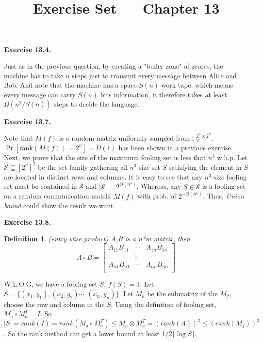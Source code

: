 \documentclass[a4paper]{article}
\title{Exercise Set --- Chapter 13}
\date{}
\newtheorem{definition}{Definition}
\newenvironment{exercise}[1]{
	\par
	\noindent\textbf{Exercise #1.}\quad
}{
	\par
	\bigskip
}
\begin{document}
    \maketitle

    \begin{exercise}{13.4}
    Just as in the previous question, by creating a "buffer zone" of zeores, the machine has to take $n$ steps just to transmit every message between Alice and Bob. And note that the machine has a space $S(n)$ work tape, which means every message can carry $S(n)$ bits information, it therefore takes at least $\Omega(n^2 / S(n))$ steps to decide the language.   
    \end{exercise}

    \begin{exercise}{13.7}
    	Note that $M(f)$ is a random matrix uniformly sampled from $\mathbb F_2^{2^n\times 2^n}$. $\Pr[\text{rank}(M(f)) = 2^n] = \Omega(1)$ has been shown in a previous exercise. Next, we prove that the size of the maximum fooling set is less that $n^3$ w.h.p. Let $\mathcal S \subseteq [2^n]^2$ be the set family gathering all $n^3$-size set $S$ satisfying the element in $S$ are located in distinct rows and columns. It is easy to see that any $n^3$-size fooling set must be contained in $\mathcal S$ and $|\mathcal S| = 2^{O(n^4)}$. Whereas, any $S \in \mathcal S$ is a fooling set on a random communication matrix $M(f)$ with prob. of $2^{-\Theta(n^6)}$. Thus, \emph{Union bound} could show the result we want.
    \end{exercise}

    \begin{exercise}{13.8}
	    \begin {definition}(entry wise product)
	        A,B is a n*m matrix, then 
	        $$A\circ B=\begin{bmatrix} 
	   	A_{11}B_{11} &\cdots  & A_{1n}B_{1n} \\
	        &\vdots&\\
	   	A_{n1}B_{n1} & \cdots&A_{nn}B_{nn}\\
	   	\end{bmatrix}	$$
	    \end{definition}
	    W.L.O.G, we have a fooling set $S$, $f(S) = 1$. Let $S = \{(x_1,y_1),(x_2,y_2)\cdots,(x_n,y_n)\}$. Let $M_a$ be the submatrix of the $M_f$, choose the row and column in the $S$. Using the definition of  fooling set, $M_a \circ M_a^T = I$. So $|S| = rank(I) = rank(M_a \circ M_a^T) \le M_a \otimes M_a^T = (rank(A))^2 \le (rank(M_f))^2$. So the rank method can get a lower bound at least 1/2$\lceil \log S \rceil$.
	\end{exercise}
\end{document}
